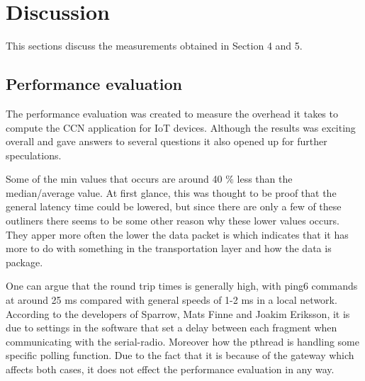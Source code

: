 \section{Discussion}
This sections discuss the measurements obtained in Section 4 and 5.

\subsection{Performance evaluation}
The performance evaluation was created to measure the overhead it takes to compute the CCN application for IoT devices. Although the results was exciting overall and gave answers to several questions it also opened up for further speculations.

Some of the min values that occurs are around 40 $\%$ less than the median/average value. At first glance, this was thought to be proof that the general latency time could be lowered, but since there are only a few of these outliners there seems to be some other reason why these lower values occurs. They apper more often the lower the data packet is which indicates that it has more to do with something in the transportation layer and how the data is package.

One can argue that the round trip times is generally high, with ping6 commands at around 25 ms compared with general speeds of 1-2 ms in a local network. According to the developers of Sparrow, Mats Finne and Joakim Eriksson, it is due to settings in the software that set a delay between each fragment when communicating with the serial-radio. Moreover how the pthread is handling some specific polling function. Due to the fact that it is because of the gateway which affects both cases, it does not effect the performance evaluation in any way.

